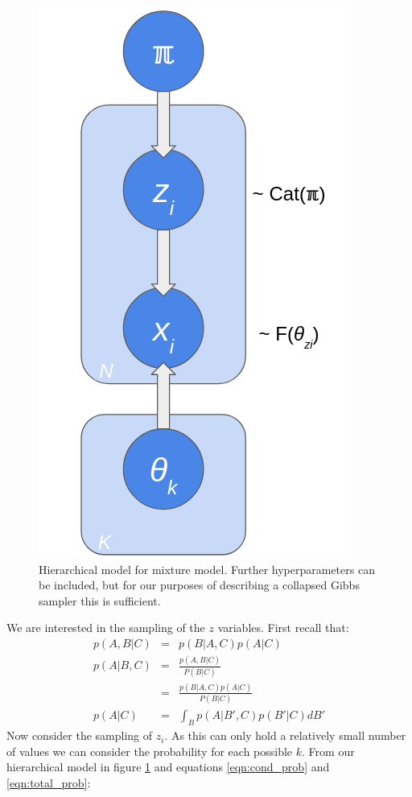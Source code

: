 \documentclass[12pt]{article} %
\begin{document}
	\begin{figure}[!htb]
		\centering
		\includegraphics[scale=0.45]{./hierarchical_mixture_model.png}
		\caption{Hierarchical model for mixture model. Further hyperparameters can be included, but for our purposes of describing a collapsed Gibbs sampler this is sufficient.}
		\label{fig:hierarchical_mode}
	\end{figure}
	
	We are interested in the sampling of the $z$ variables. First recall that:
	\begin{eqnarray}
	p(A, B | C) &=& p(B | A, C) p (A | C) \\
	p(A|B, C) &=& \frac{p(A, B | C)}{P(B|C)} \\
	  &=& \frac{p(B | A, C) p (A | C)}{P(B|C)} \label{eqn:cond_prob} \\
	p(A | C) &=& \int_B p(A | B', C) p(B' | C) dB' \label{eqn:total_prob}
	\end{eqnarray}
	Now consider the sampling of $z_i$. As this can only hold a relatively small number of values we can consider the probability for each possible $k$. From our hierarchical model in figure \ref{fig:hierarchical_mode} and equations \ref{eqn:cond_prob}  and \ref{eqn:total_prob}:
	
\end{document}
